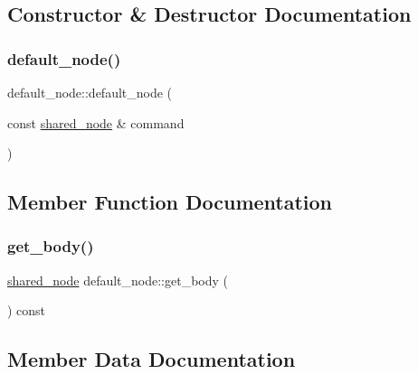 \subsection{Constructor \& Destructor Documentation}
\mbox{\label{classjawe_1_1default__node_a7c1eb033a8801fd4f2d7c65733c8dfea}} 
\subsubsection{\texorpdfstring{default\+\_\+node()}{default\_node()}}
{\footnotesize\ttfamily default\+\_\+node\+::default\+\_\+node (\begin{DoxyParamCaption}\item[{const \hyperlink{namespacejawe_a3f307481d921b6cbb50cc8511fc2b544}{shared\+\_\+node} \&}]{command }\end{DoxyParamCaption})}



\subsection{Member Function Documentation}
\mbox{\label{classjawe_1_1default__node_a9ea25fb0259faec5fd9b7b89711a61da}} 
\subsubsection{\texorpdfstring{get\+\_\+body()}{get\_body()}}
{\footnotesize\ttfamily \hyperlink{namespacejawe_a3f307481d921b6cbb50cc8511fc2b544}{shared\+\_\+node} default\+\_\+node\+::get\+\_\+body (\begin{DoxyParamCaption}{ }\end{DoxyParamCaption}) const}



\subsection{Member Data Documentation}
\mbox{\label{classjawe_1_1default__node_a425524b6bbd0d56f7c3b07b194e227d2}} 
